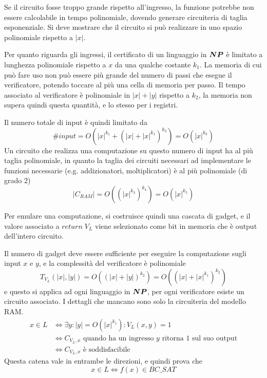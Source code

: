 Se il circuito fosse troppo grande rispetto all'ingresso, la funzione potrebbe non essere calcolabile in tempo polinomiale, dovendo generare circuiteria di taglia esponenziale. Si deve mostrare che il circuito si può realizzare in uno spazio polinomiale rispetto a $|x|$.

Per quanto riguarda gli ingressi, il certificato di un linguaggio in $\bm{NP}$ è limitato a lunghezza polinomiale rispetto a $x$ da una qualche costante $k_1$. La memoria di cui può fare uso non può essere più grande del numero di passi che esegue il verificatore, potendo toccare al più una cella di memoria per passo.
Il tempo associato al verificatore è polinomiale in $|x|+|y|$ rispetto a $k_2$, la memoria non supera quindi questa quantità, e lo stesso per i registri.

Il numero totale di input è quindi limitato da
\begin{equation*}
    \# input =
    O \left( |x|^{k_1} + \left( |x|+|x|^{k_1} \right)^{k_2} \right)
    =
    O \left( |x|^{k_3} \right)
\end{equation*}
Un circuito che realizza una computazione su questo numero di input ha al più taglia polinomiale, in quanto la taglia dei circuiti necessari ad implementare le funzioni necessarie (e.g. addizionatori, moltiplicatori) è al più polinomiale (di grado 2)
\begin{equation*}
    |C_{RAM}| =
    O
    \left( 
        \left( |x|^{k_3} \right)^{k_4}
    \right)
    =
    O \left( |x|^{k_5} \right)
\end{equation*}

Per emulare una computazione, si costruisce quindi una cascata di gadget, e il valore associato a $return \; V_L$ viene selezionato come bit in memoria che è output dell'intero circuito.

Il numero di gadget deve essere sufficiente per eseguire la computazione sugli input $x$ e $y$, e la complessità del verificatore è polinomiale
\begin{equation*}
    T_{V_{L}} (|x|, |y|) = O \left( \left( |x|+|y| \right)^{k_{2}} \right) = 
    O \left( \left( |x|+|x|^{k_1} \right)^{k_2} \right)
\end{equation*}
e questo si applica ad ogni linguaggio in $\bm{NP}$, per ogni verificatore esiste un circuito associato. I dettagli che mancano sono solo la circuiteria del modello RAM.
\begin{align*}
    x \in L
    &\Leftrightarrow
    \exists y : |y| = O \left( |x|^{k_1} \right) : V_L (x,y) = 1 
    \\
    &\Leftrightarrow 
    C_{V_L, x} \text{ quando ha un ingresso $y$ ritorna $1$ sul suo output}
    \\
    &\Leftrightarrow 
    C_{V_L, x} \text{ è soddisfacibile}
\end{align*}
Questa catena vale in entrambe le direzioni, e quindi prova che
\begin{equation*}
    x \in L \Leftrightarrow f(x) \in BC\_SAT
\end{equation*}

